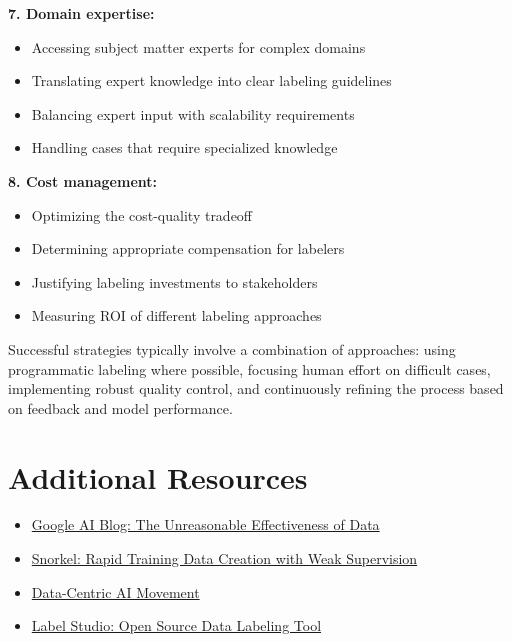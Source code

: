 \documentclass[12pt]{article}
\begin{document}
\begin{enumerate}
\begin{tcolorbox}[colback=blue!5!white,colframe=blue!75!black,title={Solution}]
    \textbf{7. Domain expertise:}
    \begin{itemize}
        \item Accessing subject matter experts for complex domains
        \item Translating expert knowledge into clear labeling guidelines
        \item Balancing expert input with scalability requirements
        \item Handling cases that require specialized knowledge
    \end{itemize}
    
    \textbf{8. Cost management:}
    \begin{itemize}
        \item Optimizing the cost-quality tradeoff
        \item Determining appropriate compensation for labelers
        \item Justifying labeling investments to stakeholders
        \item Measuring ROI of different labeling approaches
    \end{itemize}
    
    Successful strategies typically involve a combination of approaches: using programmatic labeling where possible, focusing human effort on difficult cases, implementing robust quality control, and continuously refining the process based on feedback and model performance.
    \end{tcolorbox}
\end{enumerate}

\section{Additional Resources}

\begin{itemize}
    \item \href{https://ai.googleblog.com/2017/07/revisiting-unreasonable-effectiveness.html}{Google AI Blog: The Unreasonable Effectiveness of Data}
    \item \href{http://cidrdb.org/cidr2019/papers/p58-ratner-cidr19.pdf}{Snorkel: Rapid Training Data Creation with Weak Supervision}
    \item \href{https://datacentricai.org/}{Data-Centric AI Movement}
    \item \href{https://labelstud.io/}{Label Studio: Open Source Data Labeling Tool}
\end{itemize}
\end{document}

